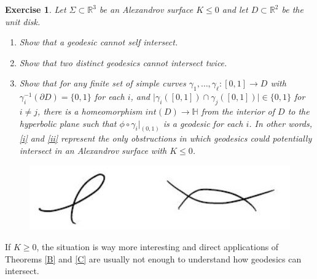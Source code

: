 \documentclass[oneside,a4paper]{amsart}
\newtheorem{exer}[thm]{Exercise}
\begin{document}
\begin{exer}
Let $\Sigma\subset \mathbb{R}^3$ be an Alexandrov surface $K \leq 0$ and let $D\subset \mathbb{R}^2$ be the unit disk.
\begin{enumerate}
\item \label{i} Show that a geodesic cannot self intersect.
\item \label{ii} Show that two distinct geodesics cannot intersect twice.
\item Show that for any finite set of simple curves $\gamma_1 , \ldots , \gamma _{\ell} : [0,1] \to D$ with $\gamma_i^{-1}(\partial D) = \{ 0,1 \}$ for each $i$, and $\vert \gamma_i ([0,1]) \cap \gamma_j ([0,1]) \vert \in \{ 0,1 \}$ for $i \neq j$, there is a homeomorphism $int (D) \to \mathbb{H}$ from the interior of $D$ to the hyperbolic plane such that $\phi \circ \gamma_i \vert_{(0,1)}$ is a geodesic for each $i$. In other words, \ref{i} and \ref{ii} represent the only obstructions in which geodesics could potentially intersect in an Alexandrov surface with $K \leq 0$.
\end{enumerate}
\end{exer}


\begin{figure}[h]
\begin{center}
\includegraphics[scale=0.9]{P4.jpg}\\
\end{center}
\end{figure}

If $K \geq 0$, the situation is way more interesting and direct applications of Theorems \ref{B} and \ref{C} are usually not enough to understand how geodesics can intersect.
\end{document}
